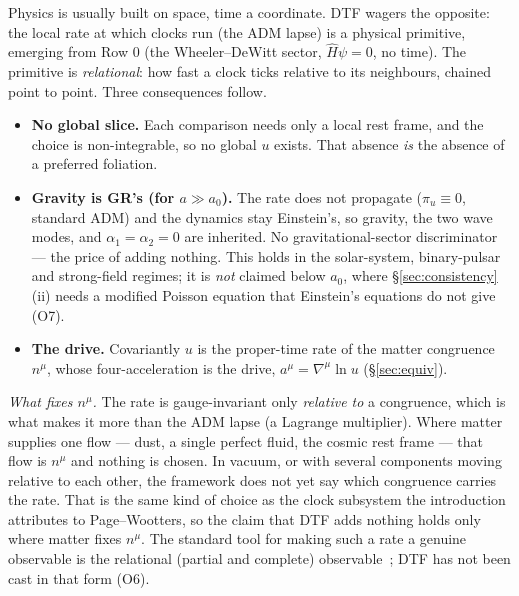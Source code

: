 \documentclass[11pt]{article}
\begin{document}
Physics is usually built on space, time a coordinate. DTF wagers the opposite: the local rate at which clocks
run (the ADM lapse) is a physical primitive, emerging from Row 0 (the Wheeler--DeWitt sector, $\hat H\psi=0$,
no time). The primitive is \emph{relational}: how fast a clock ticks relative to its neighbours, chained point to
point. Three consequences follow.
\begin{itemize}[leftmargin=1.4em,itemsep=1pt,topsep=2pt]
\item \textbf{No global slice.} Each comparison needs only a local rest frame, and the choice is
  non-integrable, so no global $u$ exists. That absence \emph{is} the absence of a preferred foliation.
\item \textbf{Gravity is GR's (for $a\gg a_0$).} The rate does not propagate ($\pi_u\equiv0$, standard ADM) and the dynamics
  stay Einstein's, so gravity, the two wave modes, and $\alpha_1=\alpha_2=0$ are inherited. No
  gravitational-sector discriminator --- the price of adding nothing. This holds in the solar-system, binary-pulsar
  and strong-field regimes; it is \emph{not} claimed below $a_0$, where \S\ref{sec:consistency}(ii) needs a
  modified Poisson equation that Einstein's equations do not give (O7).
\item \textbf{The drive.} Covariantly $u$ is the proper-time rate of the matter congruence $n^\mu$, whose
  four-acceleration is the drive, $a^\mu=\nabla^\mu\ln u$ (\S\ref{sec:equiv}).
\end{itemize}
\noindent\emph{What fixes $n^\mu$.} The rate is gauge-invariant only \emph{relative to} a congruence, which is
what makes it more than the ADM lapse (a Lagrange multiplier). Where matter supplies one flow --- dust, a single
perfect fluid, the cosmic rest frame --- that flow is $n^\mu$ and nothing is chosen. In vacuum, or with several
components moving relative to each other, the framework does not yet say which congruence carries the rate.
That is the same kind of choice as the clock subsystem the introduction attributes to Page--Wootters, so the
claim that DTF adds nothing holds only where matter fixes $n^\mu$. The standard tool for making such a rate a
genuine observable is the relational (partial and complete) observable~\cite{Rovelli2002,Dittrich2006}; DTF has
not been cast in that form (O6).
\end{document}
